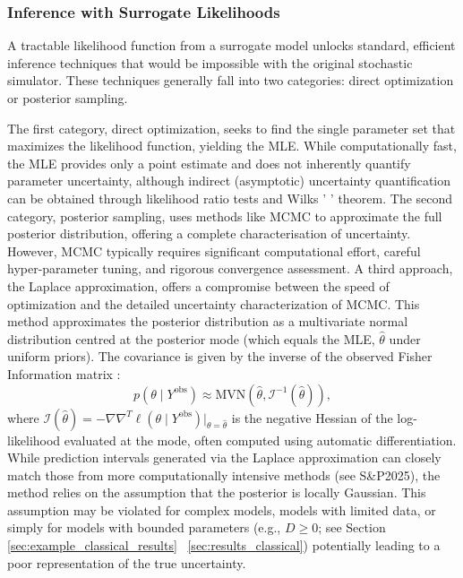\documentclass{article}
\newcommand{\SP}{S\&P2025}
\providecommand{\DIFaddtex}[1]{{\protect\color{blue} \sf #1}} %
\providecommand{\DIFdeltex}[1]{{\protect\color{red} \scriptsize #1}} %
\providecommand{\DIFaddbegin}{} %
\providecommand{\DIFaddend}{} %
\providecommand{\DIFdelbegin}{} %
\providecommand{\DIFdelend}{} %
\providecommand{\DIFadd}[1]{\texorpdfstring{\DIFaddtex{#1}}{#1}} %
\providecommand{\DIFdel}[1]{\texorpdfstring{\DIFdeltex{#1}}{}} %
\newcommand{\DIFscaledelfig}{0.5}
\newlength{\DIFdelgraphicswidth} %
\newlength{\DIFdelgraphicsheight} %
\newcommand{\DIFaddincludegraphics}[2][]{{\color{blue}\fbox{\DIFOincludegraphics[#1]{#2}}}} %
\newcommand{\DIFdelincludegraphics}[2][]{%
\sbox{\DIFdelgraphicsbox}{\DIFOincludegraphics[#1]{#2}}%
\settoboxwidth{\DIFdelgraphicswidth}{\DIFdelgraphicsbox} %
\settoboxtotalheight{\DIFdelgraphicsheight}{\DIFdelgraphicsbox} %
\scalebox{\DIFscaledelfig}{%
\parbox[b]{\DIFdelgraphicswidth}{\usebox{\DIFdelgraphicsbox}\\[-\baselineskip] \rule{\DIFdelgraphicswidth}{0em}}\llap{\resizebox{\DIFdelgraphicswidth}{\DIFdelgraphicsheight}{%
\setlength{\unitlength}{\DIFdelgraphicswidth}%
\begin{picture}(1,1)%
\thicklines\linethickness{2pt} %
{\color[rgb]{1,0,0}\put(0,0){\framebox(1,1){}}}%
{\color[rgb]{1,0,0}\put(0,0){\line( 1,1){1}}}%
{\color[rgb]{1,0,0}\put(0,1){\line(1,-1){1}}}%
\end{picture}%
}\hspace*{3pt}}} %
} %
\DeclareRobustCommand{\DIFaddbegin}{\DIFOaddbegin \let\includegraphics\DIFaddincludegraphics} %
\DeclareRobustCommand{\DIFaddend}{\DIFOaddend \let\includegraphics\DIFOincludegraphics} %
\DeclareRobustCommand{\DIFdelbegin}{\DIFOdelbegin \let\includegraphics\DIFdelincludegraphics} %
\DeclareRobustCommand{\DIFdelend}{\DIFOaddend \let\includegraphics\DIFOincludegraphics} %
\begin{document}
\subsubsection{Inference with Surrogate Likelihoods}
A tractable likelihood function from a surrogate model unlocks standard, efficient inference techniques that would be impossible with the original stochastic simulator. These techniques generally fall into two categories: direct optimization or posterior sampling.

The first category, direct optimization, seeks to find the single parameter set that maximizes the likelihood function, yielding the MLE. While computationally fast, the MLE provides only a point estimate and does not inherently quantify parameter uncertainty, although indirect (asymptotic) uncertainty quantification can be obtained through likelihood ratio tests and Wilks\DIFdelbegin \DIFdel{’ }\DIFdelend \DIFaddbegin \DIFadd{' }\DIFaddend theorem. The second category, posterior sampling, uses methods like MCMC to approximate the full posterior distribution, offering a complete characterisation of uncertainty. However, MCMC typically requires significant computational effort, careful hyper-parameter tuning, and rigorous convergence assessment. A third approach, the Laplace approximation, offers a compromise between the speed of optimization and the detailed uncertainty characterization of MCMC. This method approximates the posterior distribution as a multivariate normal distribution centred at the posterior mode (which equals the MLE, $\hat{\theta}$ under uniform priors). The covariance is given by the inverse of the observed Fisher Information matrix
\DIFdelbegin \DIFdel{:
}\DIFdelend \begin{equation}
	p(\theta \mid Y^{\text{obs}}) \approx \text{MVN}(\hat{\theta}, \mathcal{I}^{-1}(\hat{\theta})),
\end{equation}
where $\mathcal{I}(\hat{\theta}) = -\nabla\nabla^T \ell(\theta \mid Y^{\text{obs}})|_{\theta=\hat{\theta}}$ is the negative Hessian of the log-likelihood evaluated at the mode, often computed using automatic differentiation. While prediction intervals generated via the Laplace approximation can closely match those from more computationally intensive methods (see \SP), the method relies on the assumption that the posterior is locally Gaussian. This assumption may be violated for complex models, models with limited data, or simply for models with bounded parameters (e.g., $D \ge 0$; see Section\DIFdelbegin \DIFdel{\ref{sec:example_classical_results}}\DIFdelend \DIFaddbegin \DIFadd{~\ref{sec:results_classical}}\DIFaddend ) potentially leading to a poor representation of the true uncertainty.
\end{document}
